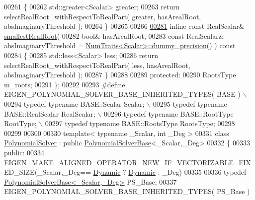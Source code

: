 \begin{DoxyCode}
00261 \textcolor{keyword}{    }\{
00262       std::greater<Scalar> greater;
00263       \textcolor{keywordflow}{return} selectRealRoot\_withRespectToRealPart( greater, hasArealRoot, absImaginaryThreshold );
00264     \}
00265 
00266 
\hyperlink{class_eigen_1_1_polynomial_solver_base_a24b054cdf82a8e9409bea47c3c05c756}{00281}     \textcolor{keyword}{inline} \textcolor{keyword}{const} RealScalar& \hyperlink{class_eigen_1_1_polynomial_solver_base_a24b054cdf82a8e9409bea47c3c05c756}{smallestRealRoot}(
00282         \textcolor{keywordtype}{bool}& hasArealRoot,
00283         \textcolor{keyword}{const} RealScalar& absImaginaryThreshold = 
      \hyperlink{group___core___module_struct_eigen_1_1_num_traits}{NumTraits<Scalar>::dummy\_precision}() )\textcolor{keyword}{ const}
00284 \textcolor{keyword}{    }\{
00285       std::less<Scalar> less;
00286       \textcolor{keywordflow}{return} selectRealRoot\_withRespectToRealPart( less, hasArealRoot, absImaginaryThreshold );
00287     \}
00288 
00289   \textcolor{keyword}{protected}:
00290     RootsType               m\_roots;
00291 \};
00292 
00293 \textcolor{preprocessor}{#define EIGEN\_POLYNOMIAL\_SOLVER\_BASE\_INHERITED\_TYPES( BASE )  \(\backslash\)}
00294 \textcolor{preprocessor}{  typedef typename BASE::Scalar                 Scalar;       \(\backslash\)}
00295 \textcolor{preprocessor}{  typedef typename BASE::RealScalar             RealScalar;   \(\backslash\)}
00296 \textcolor{preprocessor}{  typedef typename BASE::RootType               RootType;     \(\backslash\)}
00297 \textcolor{preprocessor}{  typedef typename BASE::RootsType              RootsType;}
00298 
00299 
00300 
00330 \textcolor{keyword}{template}< \textcolor{keyword}{typename} \_Scalar, \textcolor{keywordtype}{int} \_Deg >
00331 \textcolor{keyword}{class }\hyperlink{class_eigen_1_1_polynomial_solver}{PolynomialSolver} : \textcolor{keyword}{public} \hyperlink{class_eigen_1_1_polynomial_solver_base}{PolynomialSolverBase}<\_Scalar,\_Deg>
00332 \{
00333   \textcolor{keyword}{public}:
00334     EIGEN\_MAKE\_ALIGNED\_OPERATOR\_NEW\_IF\_VECTORIZABLE\_FIXED\_SIZE(\_Scalar,\_Deg==
      \hyperlink{namespace_eigen_ad81fa7195215a0ce30017dfac309f0b2}{Dynamic} ? \hyperlink{namespace_eigen_ad81fa7195215a0ce30017dfac309f0b2}{Dynamic} : \_Deg)
00335 
00336     \textcolor{keyword}{typedef} \hyperlink{class_eigen_1_1_polynomial_solver_base}{PolynomialSolverBase<\_Scalar,\_Deg>}    PS\_Base;
00337     EIGEN\_POLYNOMIAL\_SOLVER\_BASE\_INHERITED\_TYPES( PS\_Base )

\end{DoxyCode}
